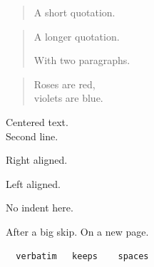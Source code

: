 \documentclass{article}
\begin{document}
\begin{quote}
A short quotation.
\end{quote}
\begin{quotation}
A longer quotation.

With two paragraphs.
\end{quotation}
\begin{verse}
Roses are red,\\
violets are blue.
\end{verse}
\begin{center}
Centered text.\\Second line.
\end{center}
\begin{flushright}
Right aligned.
\end{flushright}
\begin{flushleft}
Left aligned.
\end{flushleft}
\noindent No indent here.

\bigskip
After a big skip.
\newpage
On a new page.
\begin{verbatim}
  verbatim   keeps    spaces
\end{verbatim}
\end{document}

